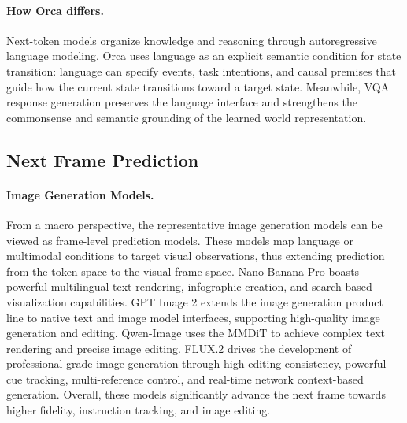 \documentclass{llmxive}
\begin{document}
\vspace{-0.5em}
\paragraph{How Orca differs.}
Next-token models organize knowledge and reasoning through autoregressive language modeling.
Orca uses language as an explicit semantic condition for state transition: language can specify events, task intentions, and causal premises that guide how the current state transitions toward a target state.
Meanwhile, VQA response generation preserves the language interface and strengthens the commonsense and semantic grounding of the learned world representation.


\vspace{-1em}
\subsection{Next Frame Prediction}\label{sec:nfp}
\vspace{-0.5em}
\paragraph{Image Generation Models.}\label{sec:vgms}
From a macro perspective, the representative image generation models can be viewed as frame-level prediction models. These models map language or multimodal conditions to target visual observations, thus extending prediction from the token space to the visual frame space. Nano Banana Pro  \citep{nanobananapro} boasts powerful multilingual text rendering, infographic creation, and search-based visualization capabilities. GPT Image 2 \citep{ChatGPT-Images-2.0} extends the image generation product line to native text and image model interfaces, supporting high-quality image generation and editing. Qwen-Image \citep{Qwen-image} uses the MMDiT \citep{SD3} to achieve complex text rendering and precise image editing. FLUX.2 \citep{flux2} drives the development of professional-grade image generation through high editing consistency, powerful cue tracking, multi-reference control, and real-time network context-based generation. Overall, these models significantly advance the next frame towards higher fidelity, instruction tracking, and image editing.


\vspace{-0.5em}
\end{document}
